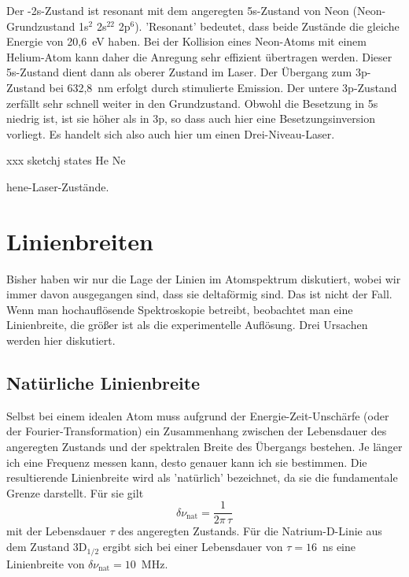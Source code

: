Der -2s-Zustand ist resonant mit dem angeregten 5s-Zustand von Neon (Neon-Grundzustand 1s$^2$ 2s$^22$ 2p$^6$). 'Resonant' bedeutet, dass beide Zustände die gleiche Energie von 20,6~eV haben.  Bei der Kollision eines Neon-Atoms mit einem Helium-Atom kann daher die Anregung sehr effizient übertragen werden. Dieser 5s-Zustand dient dann als oberer Zustand im Laser. Der Übergang zum 3p-Zustand bei 632,8~nm erfolgt durch stimulierte Emission. Der untere 3p-Zustand zerfällt sehr schnell weiter in den Grundzustand. Obwohl die Besetzung in 5s niedrig ist, ist sie höher als in 3p, so dass auch hier eine Besetzungsinversion vorliegt. Es handelt sich also auch hier um einen Drei-Niveau-Laser.

\begin{marginfigure}
    xxx sketchj states He Ne
    \caption{hene-Laser-Zustände.}
    \label{fig:7_hene_laser}
\end{marginfigure}

\section{Linienbreiten}

Bisher haben wir nur die Lage der Linien im Atomspektrum diskutiert, wobei wir immer davon ausgegangen sind, dass sie deltaförmig sind. Das ist nicht der Fall. Wenn man hochauflösende Spektroskopie betreibt, beobachtet man eine Linienbreite, die größer ist als die experimentelle Auflösung. Drei Ursachen werden hier diskutiert.

\subsection{Natürliche Linienbreite} 

Selbst bei einem idealen Atom muss aufgrund der Energie-Zeit-Unschärfe (oder der Fourier-Transformation) ein Zusammenhang zwischen der Lebensdauer des angeregten Zustands und der spektralen Breite des Übergangs bestehen. Je länger ich eine Frequenz messen kann, desto genauer kann ich sie bestimmen. Die resultierende Linienbreite wird als 'natürlich' bezeichnet, da sie die fundamentale Grenze darstellt. Für sie gilt
\begin{equation}
    \delta \nu_\text{nat} = \frac{1}{2\pi \, \tau}
\end{equation}
mit der Lebensdauer $\tau$ des angeregten Zustands. Für die Natrium-D-Linie aus dem Zustand 3D$_{1/2}$ ergibt sich bei einer Lebensdauer von $\tau = 16$~ns eine Linienbreite von $\delta \nu_\text{nat} = 10$~MHz.

